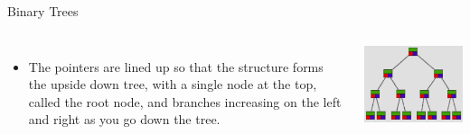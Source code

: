 \documentclass{beamer}
\begin{document}
\begin{frame}{Binary Trees}
\begin{columns}[c]
\begin{itemize}
\item The pointers are lined up so that the structure forms the upside down tree, with a single node at the top, called the root node, and branches increasing on the left and right as you go down the tree.
\end{itemize}
\includegraphics[width=1.0\textwidth]{../imgs/binary-tree-color.png}
\end{columns}
\end{frame}
\end{document}
